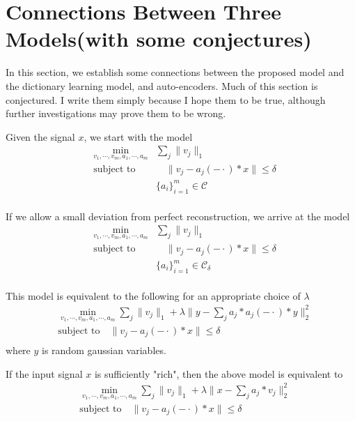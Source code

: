 \documentclass[a4paper]{article}
\begin{document}
{\color{blue}
\section{Connections Between Three Models(with some conjectures)}
In this section, we establish some connections between the proposed model and the dictionary learning model, and auto-encoders. Much of this section is conjectured. I write them simply because I hope them to be true, although further investigations may prove them to be wrong. 

Given the signal $x$, we start with the model
\begin{equation}
	\begin{aligned}
		&\min_{v_1,\cdots,v_m,a_1,\cdots,a_m}& \sum_j \|v_j\|_1\\
		&\textrm{subject to} &\quad \|v_j - a_j(-\cdot)*x\|\leq \delta \\
		& &\{a_i\}_{i=1}^m \in \mathcal{C} \\
	\end{aligned}
\end{equation}

If we allow a small deviation from perfect reconstruction, we arrive at the model
\begin{equation}
	\begin{aligned}
		&\min_{v_1,\cdots,v_m,a_1,\cdots,a_m}& \sum_j \|v_j\|_1\\
		&\textrm{subject to} &\quad \|v_j - a_j(-\cdot)*x\|\leq \delta \\
		& &\{a_i\}_{i=1}^m \in \mathcal{C_\delta} \\
	\end{aligned}
\end{equation}

{\color{red} This model is equivalent to the following for an appropriate choice of $\lambda$}
\begin{equation}
	\begin{aligned}
		&\min_{v_1,\cdots,v_m,a_1,\cdots,a_m} \sum_j \|v_j\|_1 + \lambda \|y-\sum_j a_j*a_j(-\cdot)*y\|_2^2\\
		&\textrm{subject to} \quad \|v_j - a_j(-\cdot)*x\|\leq \delta \\
	\end{aligned}
\end{equation}
where $y$ is random gaussian variables.

If the input signal $x$ is sufficiently "rich", then the above model is equivalent to 
\begin{equation}
	\begin{aligned}
		&\min_{v_1,\cdots,v_m,a_1,\cdots,a_m} \sum_j \|v_j\|_1 + \lambda \|x-\sum_j a_j*v_j\|_2^2\\
		&\textrm{subject to} \quad \|v_j - a_j(-\cdot)*x\|\leq \delta \\
	\end{aligned}
\end{equation}

}
\end{document}
